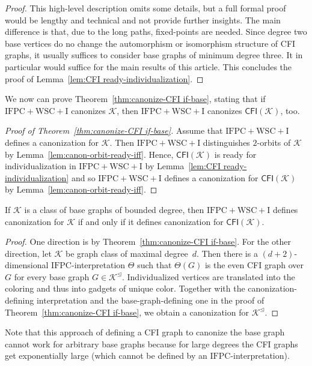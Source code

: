 \documentclass[]{lmcs}
\newcommand{\interpret}{\Theta}
\newcommand{\GraphClass}{\mathcal{K}}
\newcommand{\IFPC}{\ensuremath{\mathrm{IFPC}}}
\newcommand{\IFPCWSCI}{\ensuremath{\mathrm{IFPC{+}WSC{+}I}}}
\newcommand{\CFIsym}{\mathsf{CFI}}
\newcommand{\CFI}[1]{\CFIsym(#1)}
\newcommand{\indRel}{\trianglelefteq}
\newcommand{\indClosure}[1]{#1^\indRel}
\begin{document}
\begin{proof}
	This high-level description omits some details, but a full formal proof would be lengthy and technical and not provide further insights. The main difference is that, due to the long paths, fixed-points are needed.
	Since degree two base vertices do no change the automorphism or isomorphism structure of CFI graphs,
	it usually suffices to consider base graphs of minimum degree three.
	It in particular would suffice for the main results of this article.
	This concludes the proof of Lemma~\ref{lem:CFI ready-individualization}.	
\end{proof}


We now can prove Theorem~\ref{thm:canonize-CFI if-base},
stating that if \IFPCWSCI{} canonizes $\GraphClass$,
then \IFPCWSCI{} canonizes $\CFI{\GraphClass}$, too.
\begin{proof}[Proof of Theorem~\ref{thm:canonize-CFI if-base}]
	Assume that \IFPCWSCI{} defines a canonization for $\GraphClass$.
	Then \IFPCWSCI{} distinguishes $2$-orbits of $\GraphClass$ by Lemma~\ref{lem:canon-orbit-ready-iff}.
	Hence, $\CFI{\GraphClass}$ is ready for individualization in \IFPCWSCI{} by Lemma~\ref{lem:CFI ready-individualization} 
	and so \IFPCWSCI{} defines a canonization for $\CFI{\GraphClass}$ by Lemma~\ref{lem:canon-orbit-ready-iff}.
\end{proof}

\begin{cor}
	If $\GraphClass$ is a class of base graphs of bounded degree,
	then \IFPCWSCI{} defines canonization for $\GraphClass$ if and only if 
	it defines canonization for $\CFI{\GraphClass}$.
\end{cor}
\begin{proof}
	One direction is by Theorem~\ref{thm:canonize-CFI if-base}.
	For the other direction,
	let $\GraphClass$ be graph class of maximal degree~$d$.
	Then there is a $(d+2)$-dimensional \IFPC{}-interpretation $\interpret$
	such that $\interpret(G)$ is the even CFI graph over $G$
	for every base graph $G \in \indClosure{\GraphClass}$.
	Individualized vertices are translated into the coloring
	and thus into gadgets of unique color.
	Together with the canonization-defining interpretation
	and the base-graph-defining one in the proof of Theorem~\ref{thm:canonize-CFI if-base},
	we obtain a canonization for $\indClosure{\GraphClass}$.
\end{proof}
Note that this approach of defining a CFI graph to canonize the base graph
cannot work for arbitrary base graphs
because for large degrees the CFI graphs get exponentially large
(which cannot be defined by an \IFPC{}-interpretation).
\end{document}
